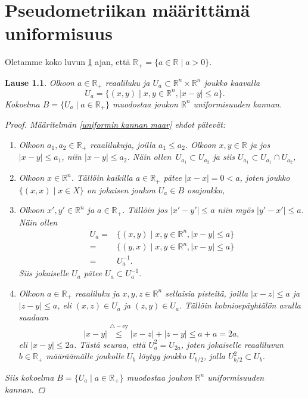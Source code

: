 \documentclass[12pt,a4paper,leqno]{report}
\newcommand{\R}{\mathbb{R}}
\theoremstyle{plain}
\newtheorem{lause}[equation]{Lause}
\theoremstyle{definition}
\theoremstyle{remark}
\begin{document}
\chapter{Pseudometriikan määrittämä uniformisuus}\label{luku_pseudo_uniformi}
Oletamme koko luvun \ref{luku_pseudo_uniformi} ajan, että $\R_+=\{a\in\R\mid a>0\}$.
\begin{lause}
Olkoon $a\in\R_+$ reaaliluku ja $U_a\subset \R^n\times\R^n$ joukko kaavalla
$$U_a=\{ (x,y)\mid x,y\in\R^n,|x-y|\leq a\}.$$
Kokoelma $B=\{U_a\mid a\in\R_+\}$ muodostaa joukon $\R^n$ uniformisuuden kannan.
\begin{proof}
Määritelmän \ref{uniformin kannan maar} ehdot pätevät:
\begin{enumerate} [label=(B\arabic*)]
\item %
Olkoon $a_1,a_2\in\R_+$ reaalilukuja, joilla $a_1\leq a_2$. Olkoon $x,y\in\R$ ja jos $|x-y|\leq a_1$, niin $|x-y|\leq a_2$. Näin ollen $\, U_{a_1}\subset U_{a_2}$ ja siis $U_{a_1}\subset U_{a_1}\cap U_{a_2}$,
\item%
Olkoon $x\in\R^n$. Tällöin kaikilla $a\in\R_+$ pätee $|x-x|=0< a$, joten joukko $\{(x,x)\mid x\in X\}$ on jokaisen joukon $U_a\in B$ osajoukko,
\item%
Olkoon $x',y'\in\R^n$ ja $a\in\R_+$. Tällöin jos $|x'-y'|\leq a$ niin myös $|y'-x'|\leq a$. Näin ollen 
\begin{align*}
U_a=&\{ (x,y)\mid x,y\in\R^n,|x-y|\leq a\}\\
=&\{ (y,x)\mid x,y\in\R^n,|x-y|\leq a\}\\
=&U_a^{-1}.
\end{align*}
Siis jokaiselle $U_a$ pätee $U_a\subset  U_a^{-1}. $
\item%
Olkoon $a\in\R_+$ reaaliluku ja $x,y,z\in\R^n$ sellaisia pisteitä, joilla $|x-z|\leq a$ ja $|z-y|\leq a$, eli $(x,z)\in U_a$ ja $(z,y)\in U_a$.
Tällöin kolmioepäyhtälön avulla saadaan 
$$|x-y|\stackrel{\triangle-\text{ey} }{\leq} |x-z|+|z-y|\leq a+a=2a,$$ 
eli $|x-y|\leq 2a$. Tästä seuraa, että $ U_a^2=U_{2a} $, joten jokaiselle reaaliluvun $b\in\R_+$ määräämälle joukolle $U_b$ löytyy joukko $U_{b/2}$, jolla $U_{b/2}^2\subset U_b$.
\end{enumerate}
Siis kokoelma $B=\{U_a\mid a\in\R_+\}$ muodostaa joukon $\R^n$ uniformisuuden kannan.
\end{proof}
\end{lause}
\end{document}
